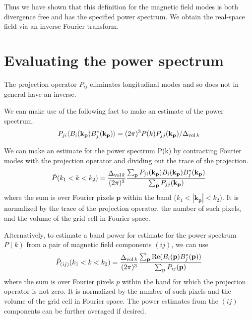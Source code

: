 \documentclass{article}
\begin{document}
Thus we have shown that this definition for the magnetic field modes is both divergence free and has the specified power spectrum.  We obtain the real-space field via an inverse Fourier transform.

\section{Evaluating the power spectrum}

The projection operator $P_{ij}$ eliminates longitudinal modes and so does not in general have an inverse.

We can make use of the following fact to make an estimate of the power spectrum.
\begin{equation}
P_{ji} \langle B_i(\mathbf{k_p}) B^*_j(\mathbf{k_{p}}) \rangle =  {(2\pi)^3 P(k)}  P_{jj}(\mathbf{k_p})/{\Delta_{{\rm vol}\,k}}
\end{equation}


We can make an estimate for the power spectrum P(k) by contracting Fourier modes with the projection operator and dividing out the trace of the projection.
\begin{equation}
  \bar P(k_1 <k < k_2) = \frac{\Delta_{{\rm vol}\,k}}{(2\pi)^3 }  \frac{\sum_{ \mathbf{p}} P_{ji}(\mathbf{k_p}) B_i(\mathbf{k_p}) B^*_j(\mathbf{k_p}) }{\sum_{ \mathbf{p}} P_{jj}(\mathbf{k_p)}}
\end{equation}
where the sum is over Fourier pixels $\mathbf{p}$ within the band  ($ k_1 < |\mathbf{k_p}|<k_2$).  It is normalized by the trace of the projection operator, the number of such pixels, and the volume of the grid cell in Fourier space.

Alternatively, to estimate a band power for estimate for the power spectrum $P(k)$ from a pair of magnetic field components $(ij)$, we can use
\begin{equation}
\bar P_{(ij)}(k_1 <k < k_2) = \frac{\Delta_{{\rm vol}\,k}}{(2\pi)^3}  \frac{ \sum_{\mathbf{p}} {\rm Re}(B_i(\mathbf{p}) B^*_j(\mathbf{p})) }{ \sum_{\mathbf{p}} P_{ij}(\mathbf{p)}}
\end{equation}
where the sum is over Fourier pixels $p$ within the band for which the projection operator is not zero.  It is normalized by the number of such pixels and the volume of the grid cell in Fourier space.
The power estimates from the $(ij)$ components can be further averaged if desired.




\end{document}
